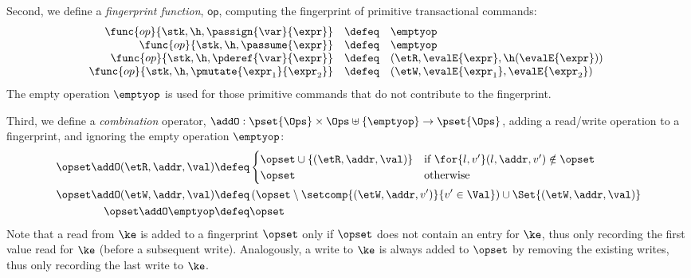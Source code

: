 
\noindent Second, we define a \emph{fingerprint function}, $\mathsf{op}$, computing the fingerprint of primitive transactional commands:
\[
\begin{array}{rcl @{\quad} rcl}
\func{op}{\stk, \h, \passign{\var}{\expr}}          & \defeq & \emptyop                                     \\
\func{op}{\stk, \h, \passume{\expr}}                & \defeq & \emptyop                                     \\
\func{op}{\stk, \h,  \pderef{\var}{\expr}}           & \defeq & (\etR, \evalE{\expr}, \h(\evalE{\expr}))    \\
\func{op}{\stk,  \h, \pmutate{\expr_{1}}{\expr_{2}}} & \defeq & (\etW, \evalE{\expr_{1}}, \evalE{\expr_{2}})\\
\end{array}
\]
The  empty operation $\emptyop$ is used for those primitive commands that do not
contribute to the fingerprint.

Third, we define a \emph{combination} operator,
$\addO  : \pset{\Ops} \times \Ops \uplus \{\emptyop\} \rightarrow \pset{\Ops}$, 
adding a read/write operation to a fingerprint, and ignoring the empty operation $\emptyop$: 
\begin{align*}
    \opset \addO (\etR, \addr, \val)  
    & \defeq
    \begin{cases}
        \opset \cup \{(\etR, \addr, \val)\} & \text{if } \for{l, v'} (l, \addr, v') \notin \opset \\
        \opset &  \text{otherwise} \\
    \end{cases}  \\
    \opset \addO (\etW, \addr, \val) 
    & \defeq 
    \left( \opset \setminus \setcomp{(\etW, \addr, v')}{v' \in \Val} \right) 
    \cup \Set{(\etW, \addr, \val)}  \\
    \opset \addO \emptyop  & \defeq  \opset  \\
\end{align*}
Note that a read from $\ke$ is added to a fingerprint $\opset$ only if $\opset$ does not contain an entry for $\ke$, thus only recording the first value read for $\ke$ (before a subsequent write). 
Analogously, a write to $\ke$ is always added to $\opset$ by removing the existing writes, thus only recording the last write to $\ke$. 

